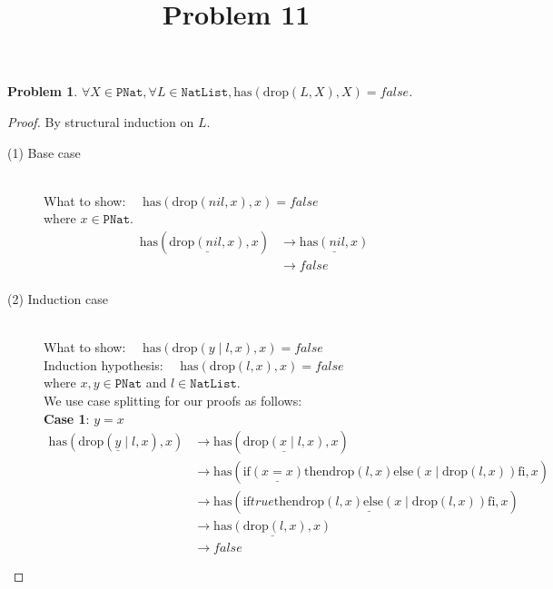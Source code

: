 \documentclass[12pt, a4paper]{article}
\title{Problem 11}
\date{\vspace{-5ex}}
\newtheorem{problem}{Problem}
\newcommand{\rel}[1]{\mathrel{#1}}
\newcommand{\rmx}[1]{\mathrm{#1}}
\newcommand{\larrow}{\longrightarrow}
\newcommand{\under}{\underline}
\begin{document}
\maketitle

\begin{problem}
$\forall X \in \mathtt{PNat}, \forall L \in \mathtt{NatList}, \rmx{has}(\rmx{drop}(L, X), X) = false$.
\end{problem}
\begin{proof}
By structural induction on $L$.

\begin{description}
\item[(1) Base case]~\\
\noindent
What to show: $\quad \rmx{has}(\rmx{drop}(nil, x), x) = false$ \\
where $x \in \mathtt{PNat}$.
\begin{align*}
\rmx{has}(\under{\rmx{drop}(nil, x)}, x)
	&\larrow \under{\rmx{has}(nil, x)} \tag{by drop1} \\
	&\larrow false \tag{by has1} \\
\end{align*}

\item[(2) Induction case]~\\
What to show: $\quad \rmx{has}(\rmx{drop}(y \rel{|} l, x), x) = false$ \\
Induction hypothesis: $\quad \rmx{has}(\rmx{drop}(l, x), x) = false$  \\
where $x, y \in \mathtt{PNat}$ and $l \in \mathtt{NatList}$. \\
We use case splitting for our proofs as follows: \\
\textbf{Case 1}: $y = x$
\begin{align*}
\rmx{has}(\rmx{drop}(\under{y} \rel{|} l, x), x)
	&\larrow \rmx{has}(\under{\rmx{drop}(x \rel{|} l, x)}, x) \tag{by case splitting} \\
	&\larrow \rmx{has}(\rel{\rmx{if}} \under{(x = x)} \rel{\rmx{then}} \rmx{drop}(l, x) \rel{\rmx{else}} (x \rel{|} \rmx{drop}(l, x)) \rel{\rmx{fi}}, x) \tag{by drop2} \\	
	&\larrow \rmx{has}(\under{\rel{\rmx{if}} true \rel{\rmx{then}} \rmx{drop}(l, x) \rel{\rmx{else}} (x \rel{|} \rmx{drop}(l, x)) \rel{\rmx{fi}}}, x) \tag{by equality} \\
	&\larrow \under{\rmx{has}(\rmx{drop}(l, x), x)} \tag{by if1} \\
	&\larrow false \tag{by IH}
\end{align*}


\end{description}
\end{proof}
\end{document}
